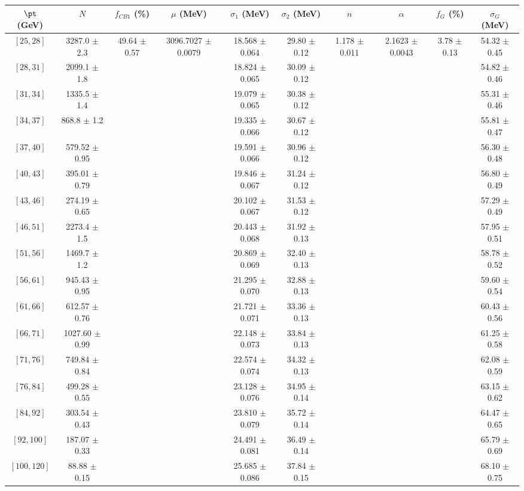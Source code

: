 \begin{tabular}{c||c|c|c|c|c|c|c|c|c}
$\pt$ (GeV) & $N$ & $f_{CB1}$ (\%)  & $\mu$ (MeV) & $\sigma_1$ (MeV) & $\sigma_2$ (MeV) & $n$ & $\alpha$ & $f_G$ (\%) & $\sigma_G$ (MeV) \\
\hline
$[25, 28]$ & 3287.0 $\pm$ 2.3 & \multirow{17}{*}{49.64 $\pm$ 0.57} & \multirow{17}{*}{3096.7027 $\pm$ 0.0079} & 18.568 $\pm$ 0.064 & 29.80 $\pm$ 0.12 & \multirow{17}{*}{1.178 $\pm$ 0.011} & \multirow{17}{*}{2.1623 $\pm$ 0.0043} & \multirow{17}{*}{3.78 $\pm$ 0.13} & 54.32 $\pm$ 0.45\\
$[28, 31]$ & 2099.1 $\pm$ 1.8 &  &  & 18.824 $\pm$ 0.065 & 30.09 $\pm$ 0.12 &  &  &  & 54.82 $\pm$ 0.46\\
$[31, 34]$ & 1335.5 $\pm$ 1.4 &  &  & 19.079 $\pm$ 0.065 & 30.38 $\pm$ 0.12 &  &  &  & 55.31 $\pm$ 0.46\\
$[34, 37]$ & 868.8 $\pm$ 1.2 &  &  & 19.335 $\pm$ 0.066 & 30.67 $\pm$ 0.12 &  &  &  & 55.81 $\pm$ 0.47\\
$[37, 40]$ & 579.52 $\pm$ 0.95 &  &  & 19.591 $\pm$ 0.066 & 30.96 $\pm$ 0.12 &  &  &  & 56.30 $\pm$ 0.48\\
$[40, 43]$ & 395.01 $\pm$ 0.79 &  &  & 19.846 $\pm$ 0.067 & 31.24 $\pm$ 0.12 &  &  &  & 56.80 $\pm$ 0.49\\
$[43, 46]$ & 274.19 $\pm$ 0.65 &  &  & 20.102 $\pm$ 0.067 & 31.53 $\pm$ 0.12 &  &  &  & 57.29 $\pm$ 0.49\\
$[46, 51]$ & 2273.4 $\pm$ 1.5 &  &  & 20.443 $\pm$ 0.068 & 31.92 $\pm$ 0.13 &  &  &  & 57.95 $\pm$ 0.51\\
$[51, 56]$ & 1469.7 $\pm$ 1.2 &  &  & 20.869 $\pm$ 0.069 & 32.40 $\pm$ 0.13 &  &  &  & 58.78 $\pm$ 0.52\\
$[56, 61]$ & 945.43 $\pm$ 0.95 &  &  & 21.295 $\pm$ 0.070 & 32.88 $\pm$ 0.13 &  &  &  & 59.60 $\pm$ 0.54\\
$[61, 66]$ & 612.57 $\pm$ 0.76 &  &  & 21.721 $\pm$ 0.071 & 33.36 $\pm$ 0.13 &  &  &  & 60.43 $\pm$ 0.56\\
$[66, 71]$ & 1027.60 $\pm$ 0.99 &  &  & 22.148 $\pm$ 0.073 & 33.84 $\pm$ 0.13 &  &  &  & 61.25 $\pm$ 0.58\\
$[71, 76]$ & 749.84 $\pm$ 0.84 &  &  & 22.574 $\pm$ 0.074 & 34.32 $\pm$ 0.13 &  &  &  & 62.08 $\pm$ 0.59\\
$[76, 84]$ & 499.28 $\pm$ 0.55 &  &  & 23.128 $\pm$ 0.076 & 34.95 $\pm$ 0.14 &  &  &  & 63.15 $\pm$ 0.62\\
$[84, 92]$ & 303.54 $\pm$ 0.43 &  &  & 23.810 $\pm$ 0.079 & 35.72 $\pm$ 0.14 &  &  &  & 64.47 $\pm$ 0.65\\
$[92, 100]$ & 187.07 $\pm$ 0.33 &  &  & 24.491 $\pm$ 0.081 & 36.49 $\pm$ 0.14 &  &  &  & 65.79 $\pm$ 0.69\\
$[100, 120]$ & 88.88 $\pm$ 0.15 &  &  & 25.685 $\pm$ 0.086 & 37.84 $\pm$ 0.15 &  &  &  & 68.10 $\pm$ 0.75\\
\end{tabular}
